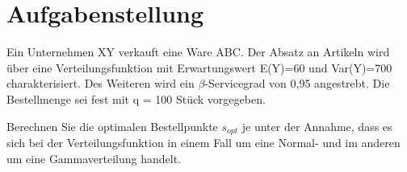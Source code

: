 \section{Aufgabenstellung}
Ein Unternehmen XY verkauft eine Ware ABC. Der Absatz an Artikeln wird über eine Verteilungsfunktion mit Erwartungswert E(Y)=60 und Var(Y)=700 charakterisiert. Des Weiteren wird ein $\beta$-Servicegrad von 0,95 angestrebt. Die Bestellmenge sei fest mit q = 100 Stück vorgegeben.

Berechnen Sie die optimalen Bestellpunkte $s_{opt}$ je unter der Annahme, dass es sich bei der Verteilungsfunktion in einem Fall um eine Normal- und im anderen um eine Gammaverteilung handelt.